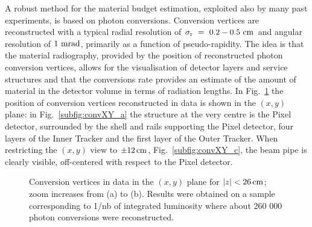 \documentclass[a4paper]{jpconf}
\begin{document}
A robust method for the material budget estimation, exploited also by many
past experiments, is based on photon conversions. 
Conversion vertices are reconstructed with a typical radial resolution of $\rm \sigma_r~=~0.2-0.5~cm$ and  angular resolution of  $1~{\rm mrad}$, primarily
as a function of pseudo-rapidity.
The idea is that the
material radiography, provided by the position of reconstructed photon
conversion vertices, allows for the visualisation of detector layers
and service structures and that the conversions rate provides an estimate of the amount of material in the
detector volume in terms of radiation lengths.
In Fig.~\ref{fig:convXY} the position of conversion vertices reconstructed in data is shown in the $(x,y)$ plane:
in Fig.~\ref{subfig:convXY_a} the structure at the very centre is the Pixel detector,
surrounded by the shell and rails supporting the Pixel detector, four layers of the Inner Tracker and the first layer of the Outer Tracker.
When restricting the $(x,y)$ view to $\pm 12\rm \, cm$, Fig.~\ref{subfig:convXY_c}, the beam pipe is clearly visible, off-centered with respect to
the Pixel detector. 
%
\begin{figure}[t!]
  \begin{center}
    \caption{Conversion vertices in data in the $(x,y)$ plane for $|z|<26\rm \, cm$; zoom increases from (a) to (b). 
    Results were obtained on a sample corresponding to 1/nb of integrated luminosity where about 260 000 photon conversions were reconstructed. 
}
\label{fig:convXY}
\end{center}
\end{figure}
\end{document}
